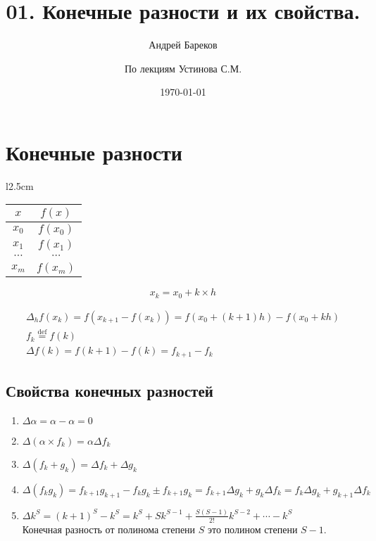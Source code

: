 \documentclass[a4paper,11pt]{article}
\title{01. Конечные разности и их свойства.}
\author{Андрей Бареков \and По лекциям Устинова С.М.}
\date{\today}
\begin{document}
\maketitle
\newpage

\section{Конечные разности}
\begin{minipage}{1\linewidth}
  \begin{wraptable}{l}{2.5cm}
    \begin{tabular}{ c|c }
      $x$ & $f(x)$ \\
      \hline
      $x_0$ & $f(x_0)$ \\
      $x_1$ & $f(x_1)$ \\
      $\cdots$ & $\cdots$ \\
      $x_m$ & $f(x_m)$
    \end{tabular}
    \vspace{1mm}
    \[x_k = x_0 + k \times h\]
  \end{wraptable}

  \begin{gather*}
    \Delta_h f(x_k) = f(x_{k+1} - f(x_k)) = f(x_0 + (k+1)h) - f(x_0 + kh) \\
    f_k \stackrel{\mathrm{def}}{=} f(k) \\
    \Delta f(k) = f(k+1) - f(k) = f_{k+1} - f_k
  \end{gather*}
\end{minipage}

\vspace{1.15cm}

  \subsection{Свойства конечных разностей}
  \begin{enumerate}
    \item \(\Delta \alpha = \alpha - \alpha = 0\)
    \item \(\Delta (\alpha \times f_k) = \alpha \Delta f_k\)
    \item \(\Delta (f_k + g_k) = \Delta f_k + \Delta g_k\)
    \item \(\Delta (f_k g_k) = f_{k+1} g_{k+1} - f_k g_k \pm f_{k+1} g_k
        = f_{k+1} \Delta g_k + g_k \Delta f_k = f_k \Delta g_k + g_{k+1} \Delta f_k\)
    \item \(\Delta k^S = (k+1)^S - k^S = k^S + Sk^{S-1} + \frac{S(S-1)}{2!}k^{S-2} + \cdots - k^S\) \\
        Конечная разность от полинома степени $S$ это полином степени $S-1$.
  \end{enumerate}
\end{document}
